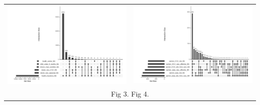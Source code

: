 \documentclass{IEEEtran}
\begin{document}
{\begin{center}
\begin{tabular}{p{8cm}p{8cm}}
\includegraphics[width=0.53\columnwidth]{children} & \includegraphics[width=0.53\columnwidth]{opinions}\\
\multicolumn{2}{c}{Fig 3. \hspace{8.5cm} Fig 4.}\\
\end{tabular}
\end{center}
}
\clearpage
\onecolumn{


}
\end{document}

